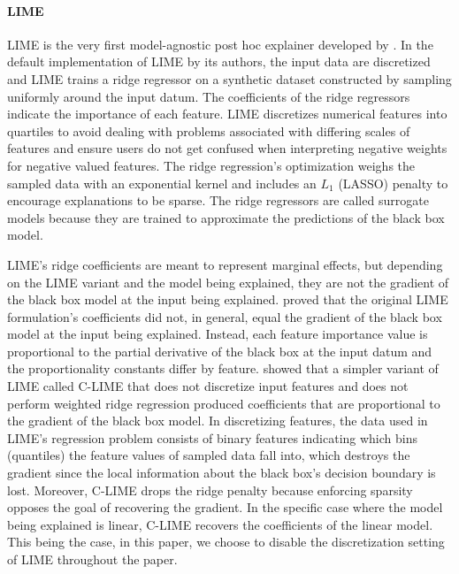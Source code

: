 \documentclass[mnsc,blindrev]{informs3}
\begin{document}
    
\paragraph{LIME}  %
LIME is the very first model-agnostic post hoc explainer developed by \citet{ribeiro16lime}. In the default implementation of LIME by its authors, the input data are discretized and LIME trains a ridge regressor on a synthetic dataset constructed by sampling uniformly around the input datum. The coefficients of the ridge regressors indicate the importance of each feature. LIME discretizes numerical features into quartiles to avoid dealing with problems associated with differing scales of features and ensure users do not get confused when interpreting negative weights for negative valued features. The ridge regression's optimization weighs the sampled data with an exponential kernel and includes an $L_1$ (LASSO) penalty to encourage explanations to be sparse. The ridge regressors are called surrogate models because they are trained to approximate the predictions of the black box model.
    
    LIME's ridge coefficients are meant to represent marginal effects, but depending on the LIME variant and the model being explained, they are not the gradient of the black box model at the input being explained. \citet{garreau2020looking} proved that the original LIME formulation's coefficients did not, in general, equal the gradient of the black box model at the input being explained. Instead, each feature importance value is proportional to the partial derivative of the black box at the input datum and the proportionality constants differ by feature. \citet{agarwal21clime} showed that a simpler variant of LIME called C-LIME that does not discretize input features and does not perform weighted ridge regression produced coefficients that are proportional to the gradient of the black box model. %
    In discretizing features, the data used in LIME's regression problem consists of binary features indicating which bins (quantiles) the feature values of sampled data fall into, which destroys the gradient since the local information about the black box's decision boundary is lost. Moreover, C-LIME drops the ridge penalty because enforcing sparsity opposes the goal of recovering the gradient. In the specific case where the model being explained is linear, C-LIME recovers the coefficients of the linear model. This being the case, in this paper, we choose to disable the discretization setting of LIME throughout the paper.
\end{document}

